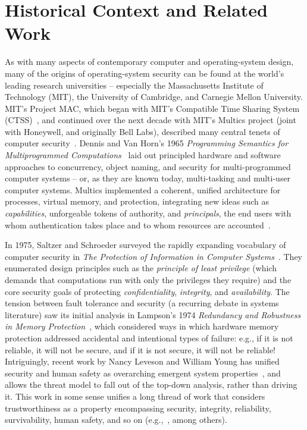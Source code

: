 \chapter{Historical Context and Related Work}
\label{chap:historical}



As with many aspects of contemporary computer and operating-system design,
many of the origins
of operating-system security can be found at the world's leading research
universities --
especially the Massachusetts Institute of Technology (MIT), the University of Cambridge,
and Carnegie Mellon University.
MIT's Project MAC, which began with MIT's Compatible Time
Sharing System (CTSS)~\cite{corbato:timesharing},
and continued over the next decade with MIT's Multics
project (joint with Honeywell, and originally Bell Labs),
described many central tenets of computer security~\cite{corbato:multics,Graham68}.
Dennis and Van Horn's 1965 {\em Programming Semantics for Multiprogrammed
Computations}~\cite{dennis:semantics} laid out principled hardware
and software approaches
to concurrency, object naming, and security for multi-programmed computer systems --
or, as they are known today, multi-tasking and multi-user computer systems.
Multics implemented a coherent, unified architecture for processes, virtual memory, and protection,
integrating new ideas such as {\em capabilities}, unforgeable tokens of authority, and
{\em principals}, the end users with whom authentication takes place and to whom resources
are accounted~\cite{Saltzer74}.

In 1975, Saltzer and Schroeder surveyed the rapidly expanding vocabulary of computer
security in {\em The Protection of Information in Computer Systems}~\cite{SaltzerSchroeder75}.
They enumerated design principles such as the {\em principle of least privilege}
(which demands that computations run with only the privileges they require) and
the core security goals of
protecting {\em confidentiality}, {\em integrity}, and {\em availability}.
The tension between fault tolerance and security (a recurring debate in
systems literature) saw its initial analysis in Lampson's 1974
{\em Redundancy and Robustness in Memory Protection}~\cite{LampsonRedund}, which
considered ways in which hardware memory protection addressed accidental and
intentional types of failure: e.g., if it is not reliable, it will not be secure,
and if it is not secure, it will not be reliable!  Intriguingly, recent work
by Nancy Leveson and William Young has unified security and human safety
as overarching emergent system properties~\cite{LevesonYoung14}, and allows
the threat model to fall out of the top-down analysis, rather than driving
it.  This work in some sense
unifies a long thread of work that considers trustworthiness as a property
encompassing security, integrity, reliability, survivability, human safety,
and so on (e.g.,~\cite{Neumann06holistic,PSOS}, among others).

